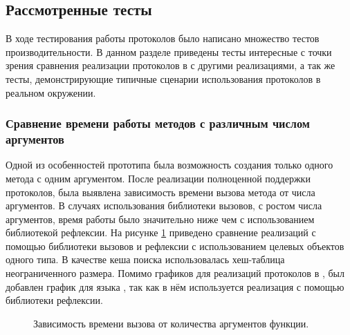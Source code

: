 \subsection{Рассмотренные тесты}
В ходе тестирования работы протоколов было написано множество тестов производительности. В данном разделе приведены тесты интересные с точки зрения сравнения реализации протоколов в  с другими реализациями, а так же тесты, демонстрирующие типичные сценарии использования протоколов в реальном окружении.

\subsubsection{Сравнение времени работы методов с различным числом аргументов}
Одной из особенностей прототипа была возможность создания только одного метода с одним аргументом. После реализации полноценной поддержки протоколов, была выявлена зависимость времени вызова метода от числа аргументов. В случаях использования библиотеки вызовов, с ростом числа аргументов, время работы было значительно ниже чем с использованием библиотекой рефлексии. На рисунке \ref{plot:bench:argsCount} приведено сравнение реализаций с помощью библиотеки вызовов и рефлексии с использованием целевых объектов одного типа. В качестве кеша поиска использовалась хеш-таблица неограниченного размера. Помимо графиков для реализаций протоколов в , был добавлен график для языка , так как в нём используется реализация с помощью библиотеки рефлексии.

\begin{figure}[H]
\caption{\label{plot:bench:argsCount}Зависимость времени вызова от количества аргументов функции.}
\end{figure}

